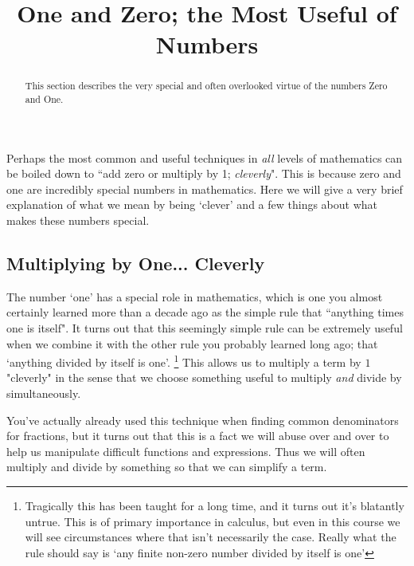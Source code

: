 \documentclass{ximera}
\title{One and Zero; the Most Useful of Numbers}
\begin{document}
\begin{abstract}
    This section describes the very special and often overlooked virtue of the numbers Zero and One.
\end{abstract}
\maketitle

Perhaps the most common and useful techniques in \textit{all} levels of mathematics can be boiled down to ``add zero or multiply by 1; \textit{cleverly}". This is because zero and one are incredibly special numbers in mathematics. Here we will give a very brief explanation of what we mean by being `clever' and a few things about what makes these numbers special.

\subsection*{Multiplying by One... Cleverly}
    The number `one' has a special role in mathematics, which is one you almost certainly learned more than a decade ago as the simple rule that ``anything times one is itself". It turns out that this seemingly simple rule can be extremely useful when we combine it with the other rule you probably learned long ago; that `anything divided by itself is one'.%
    \footnote{%
        Tragically this has been taught for a long time, and it turns out it's blatantly untrue. This is of primary importance in calculus, but even in this course we will see circumstances where that isn't necessarily the case. Really what the rule should say is `any finite non-zero number divided by itself is one'%
        }
    This allows us to multiply a term by $1$ "cleverly" in the sense that we choose something useful to multiply \textit{and} divide by simultaneously. 
    
    You've actually already used this technique when finding common denominators for fractions, but it turns out that this is a fact we will abuse over and over to help us manipulate difficult functions and expressions. Thus we will often multiply  and divide by something so that we can simplify a term.
    
\end{document}
